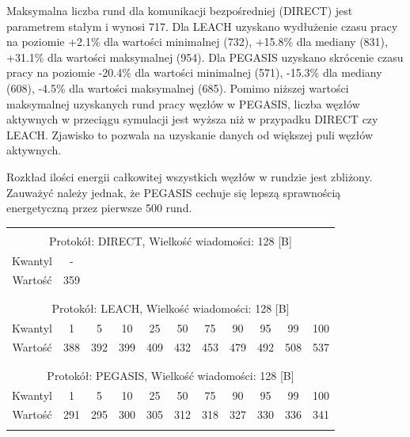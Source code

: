 \documentclass[a4paper,12pt,twoside,openany]{report}
\begin{document}
\par
Maksymalna liczba rund dla komunikacji bezpośredniej (DIRECT) jest parametrem stałym i wynosi 717.
Dla LEACH uzyskano wydłużenie czasu pracy na poziomie +2.1\% dla wartości minimalnej (732), +15.8\% dla mediany (831), +31.1\% dla wartości maksymalnej (954).
Dla PEGASIS uzyskano skrócenie czasu pracy na poziomie -20.4\% dla wartości minimalnej (571), -15.3\% dla mediany (608), -4.5\% dla wartości maksymalnej (685).
Pomimo niższej wartości maksymalnej uzyskanych rund pracy węzłów w PEGASIS, liczba węzłów aktywnych w przeciągu symulacji jest wyższa niż w przypadku DIRECT czy LEACH.
Zjawisko to pozwala na uzyskanie danych od większej puli węzłów aktywnych.
\par
Rozkład ilości energii całkowitej wszystkich węzłów w rundzie jest zbliżony.
Zauważyć należy jednak, że PEGASIS cechuje się lepszą sprawnością energetyczną przez pierwsze 500 rund. 

\begin{longtable}{*{11}{c}}
\toprule \\*
\multicolumn{11}{c}{Protokół: DIRECT, Wielkość wiadomości: 128 [B]} \\*
Kwantyl	& -	\\*
Wartość	& 359	\\*
\midrule \\*
\\*
\multicolumn{11}{c}{Protokół: LEACH, Wielkość wiadomości: 128 [B]} \\*
Kwantyl	& 1	& 5	& 10	& 25	& 50	& 75	& 90	& 95	& 99	& 100	\\*
Wartość	& 388	& 392	& 399	& 409	& 432	& 453	& 479	& 492	& 508	& 537	\\*
\midrule \\*
\\*
\multicolumn{11}{c}{Protokół: PEGASIS, Wielkość wiadomości: 128 [B]} \\*
Kwantyl	& 1	& 5	& 10	& 25	& 50	& 75	& 90	& 95	& 99	& 100	\\*
Wartość	& 291	& 295	& 300	& 305	& 312	& 318	& 327	& 330	& 336	& 341	\\*
\bottomrule \\*
\end{longtable}
\end{document}
